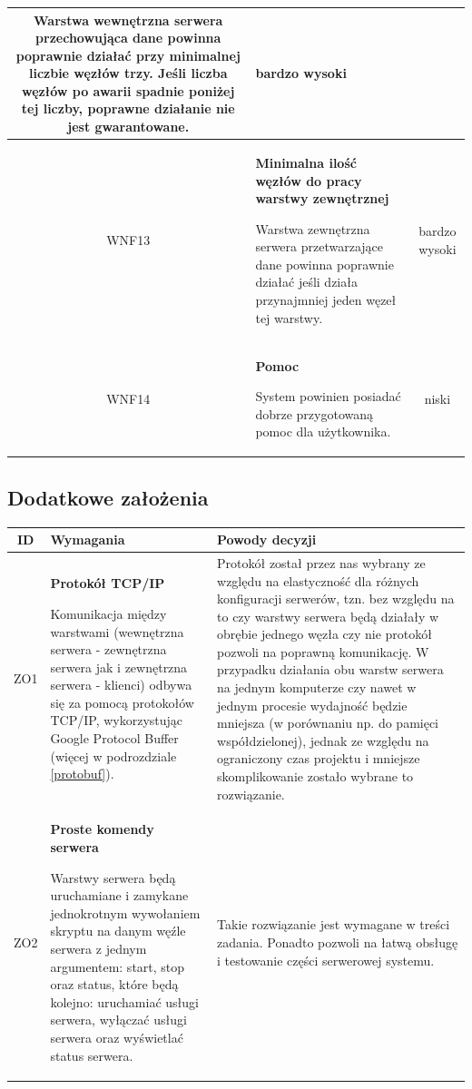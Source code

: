 {\begin{tabularx}{\textwidth}{|c|X|c|}
Warstwa wewnętrzna serwera przechowująca dane powinna poprawnie działać przy minimalnej liczbie węzłów trzy. Jeśli liczba węzłów po awarii spadnie poniżej tej liczby, poprawne działanie nie jest gwarantowane.
 & bardzo wysoki\\
\hline

\label{z:WNF13} WNF13 & \textbf{Minimalna ilość węzłów do pracy warstwy zewnętrznej} 
 
Warstwa zewnętrzna serwera przetwarzające dane powinna poprawnie działać jeśli działa przynajmniej jeden węzeł tej warstwy.
 & bardzo wysoki\\
\hline

\label{z:WNF14} WNF14 & \textbf{Pomoc} 
 
System powinien posiadać dobrze przygotowaną pomoc dla użytkownika.
 & niski \\
\hline

\end{tabularx}


\subsection[Dodatkowe założenia]{Dodatkowe założenia}

\begin{tabularx}{\textwidth}{|c|X|X|}
\hline
\textbf{ID} & \textbf{Wymagania}  & \textbf{Powody decyzji} \\
\hline

\label{z:ZO1} ZO1 &  \textbf{Protokół TCP/IP }

Komunikacja między warstwami (wewnętrzna serwera - zewnętrzna serwera jak i zewnętrzna serwera - klienci) odbywa się za pomocą protokołów TCP/IP, wykorzystując Google Protocol Buffer (więcej w podrozdziale \ref{protobuf}). & 
Protokół został przez nas wybrany ze względu na elastyczność dla różnych konfiguracji serwerów, tzn. bez względu na to czy warstwy serwera będą działały w obrębie jednego węzła czy nie protokół pozwoli na poprawną komunikację. W przypadku działania obu warstw serwera na jednym komputerze czy nawet w jednym procesie wydajność będzie mniejsza (w porównaniu np. do pamięci współdzielonej), jednak ze względu na ograniczony czas projektu i mniejsze skomplikowanie zostało wybrane to rozwiązanie. \\
\hline

\label{z:ZO2} ZO2 &  \textbf{Proste komendy serwera}

Warstwy serwera będą uruchamiane i zamykane jednokrotnym wywołaniem skryptu na danym węźle serwera z jednym argumentem: start, stop oraz status, które będą kolejno: uruchamiać usługi serwera, wyłączać usługi serwera oraz wyświetlać status serwera. & 
Takie rozwiązanie jest wymagane w treści zadania. Ponadto pozwoli na łatwą obsługę i testowanie części serwerowej systemu. \\
\hline


\end{tabularx}}
